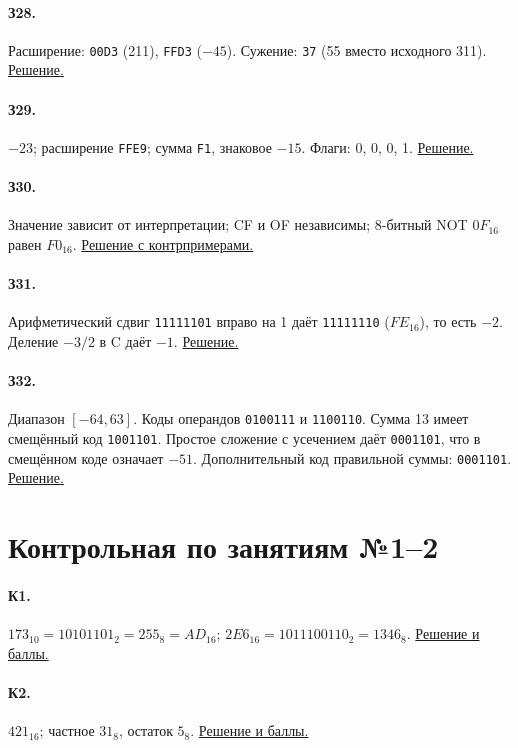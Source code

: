 \paragraph*{З28.}\label{ans:z28}
Расширение: \texttt{00D3} (211), \texttt{FFD3} ($-45$). Сужение: \texttt{37} (55 вместо исходного 311).
\hyperref[sol:z28]{Решение.}

\paragraph*{З29.}\label{ans:z29}
$-23$; расширение \texttt{FFE9}; сумма \texttt{F1}, знаковое $-15$. Флаги: 0, 0, 0, 1.
\hyperref[sol:z29]{Решение.}

\paragraph*{З30.}\label{ans:z30}
Значение зависит от интерпретации; CF и OF независимы; 8-битный NOT $0F_{16}$ равен $F0_{16}$.
\hyperref[sol:z30]{Решение с контрпримерами.}

\paragraph*{З31.}\label{ans:z31}
Арифметический сдвиг \texttt{11111101} вправо на 1 даёт \texttt{11111110} ($FE_{16}$), то есть $-2$. Деление $-3/2$ в C даёт $-1$.
\hyperref[sol:z31]{Решение.}

\paragraph*{З32.}\label{ans:z32}
Диапазон $[-64,63]$. Коды операндов \texttt{0100111} и \texttt{1100110}. Сумма 13 имеет смещённый код \texttt{1001101}. Простое сложение с усечением даёт \texttt{0001101}, что в смещённом коде означает $-51$. Дополнительный код правильной суммы: \texttt{0001101}.
\hyperref[sol:z32]{Решение.}

\section{Контрольная по занятиям №1--2}\label{answers:mock}
\paragraph*{К1.}\label{ans:k1}
$173_{10}=10101101_2=255_8=AD_{16}$;
$2E6_{16}=1011100110_2=1346_8$.
\hyperref[sol:k1]{Решение и баллы.}

\paragraph*{К2.}\label{ans:k2}
$421_{16}$; частное $31_8$, остаток $5_8$.
\hyperref[sol:k2]{Решение и баллы.}


